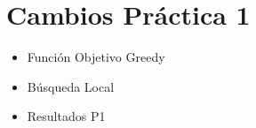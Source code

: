 \newpage
\section{Cambios Práctica 1}
\begin{itemize}
   \item Función Objetivo Greedy
   \item Búsqueda Local
   \item Resultados P1
\end{itemize}

